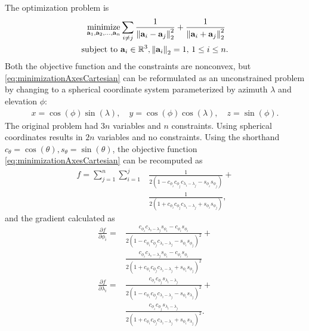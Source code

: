 The optimization problem is
\begin{align}
\underset{{\bf{a}}_1,{\bf{a}}_2,\ldots,{\bf{a}}_n}{\text{minimize}}  & \sum_{i\ne j} \frac{1}{\left\lVert{\bf{a}}_i-{\bf{a}}_j\right\rVert_2^2 }  + \frac{1}{\left\lVert{\bf{a}}_i+{\bf{a}}_j\right\rVert_2^2 } \nonumber\\
\text{subject to } & {\bf{a}}_i\in \mathbb{R}^3, \left\lVert{\bf{a}}_i\right\rVert_2 = 1,\, 1\le i\le n.
\label{eq:minimizationAxesCartesian}
\end{align}
Both the objective function and the constraints are nonconvex, but \eqref{eq:minimizationAxesCartesian} can be reformulated as an unconstrained problem by changing to a spherical coordinate system parameterized by azimuth $\lambda$ and elevation $\phi$:
\begin{align*}    %
x = \cos(\phi)\sin(\lambda), \quad
y =  \cos(\phi)\cos(\lambda), \quad
z =  \sin(\phi).
\end{align*}
The original problem had $3n$ variables and $n$ constraints.  Using spherical coordinates results in $2n$ variables and no constraints. Using the shorthand $c_\theta = \cos(\theta), s_\theta = \sin(\theta)$, 
 the objective function \eqref{eq:minimizationAxesCartesian}  can be recomputed as
\begin{align}
f = \sum_{j=1}^{n} \sum_{i=1}^{j} & \frac{1}{2\left(1- c_{\phi_i}c_{\phi_j}c_{\lambda_i-\lambda_j} - s_{\phi_i}s_{\phi_j} \right) }+\nonumber\\
						& \frac{1}{2\left(1+ c_{\phi_i}c_{\phi_j}c_{\lambda_i-\lambda_j} + s_{\phi_i}s_{\phi_j} \right) },
\label{eq:objectiveForSpherical}
\end{align}
and the gradient calculated as
\begin{align}
\frac{\partial f}{\partial \phi_i} =  & \frac{c_{\phi_i}c_{\lambda_i-\lambda_j}s_{\phi_i} - c_{\phi_i}s_{\phi_i}}{2\left(1- c_{\phi_i}c_{\phi_j}c_{\lambda_i-\lambda_j} - s_{\phi_i}s_{\phi_j} \right)^2 }+\nonumber\\
						& \frac{c_{\phi_i}c_{\lambda_i-\lambda_j}s_{\phi_i} - c_{\phi_i}s_{\phi_i}}{2\left(1+ c_{\phi_i}c_{\phi_j}c_{\lambda_i-\lambda_j} + s_{\phi_i}s_{\phi_j} \right)^2 }\nonumber \\
\frac{\partial f}{\partial \lambda_i} =  & \frac{c_{\phi_i}c_{\phi_j}s_{\lambda_i-\lambda_j} }{2\left(1- c_{\phi_i}c_{\phi_j}c_{\lambda_i-\lambda_j} - s_{\phi_i}s_{\lambda_j} \right)^2 }+\nonumber\\
						& \frac{c_{\phi_i}c_{\phi_j}s_{\lambda_i-\lambda_j} }{2\left(1+ c_{\phi_i}c_{\phi_j}c_{\lambda_i-\lambda_j} + s_{\phi_i}s_{\lambda_j} \right)^2 }.
\label{eq:gradientForSpherical}
\end{align}




